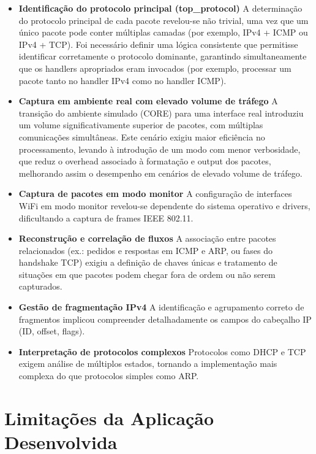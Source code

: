 \documentclass[a4paper,12pt]{article}
\begin{document}
\begin{itemize}

\item \textbf{Identificação do protocolo principal (top\_protocol)}  
A determinação do protocolo principal de cada pacote revelou-se não trivial, uma vez que um único pacote pode conter múltiplas camadas (por exemplo, IPv4 + ICMP ou IPv4 + TCP).  
Foi necessário definir uma lógica consistente que permitisse identificar corretamente o protocolo dominante, garantindo simultaneamente que os handlers apropriados eram invocados (por exemplo, processar um pacote tanto no handler IPv4 como no handler ICMP).

\item \textbf{Captura em ambiente real com elevado volume de tráfego}  
A transição do ambiente simulado (CORE) para uma interface real introduziu um volume significativamente superior de pacotes, com múltiplas comunicações simultâneas.  
Este cenário exigiu maior eficiência no processamento, levando à introdução de um modo com menor verbosidade, que reduz o overhead associado à formatação e output dos pacotes, melhorando assim o desempenho em cenários de elevado volume de tráfego.

\item \textbf{Captura de pacotes em modo monitor}  
A configuração de interfaces WiFi em modo monitor revelou-se dependente do sistema operativo e drivers, dificultando a captura de frames IEEE 802.11.

\item \textbf{Reconstrução e correlação de fluxos}  
A associação entre pacotes relacionados (ex.: pedidos e respostas em ICMP e ARP, ou fases do handshake TCP) exigiu a definição de chaves únicas e tratamento de situações em que pacotes podem chegar fora de ordem ou não serem capturados.

\item \textbf{Gestão de fragmentação IPv4}  
A identificação e agrupamento correto de fragmentos implicou compreender detalhadamente os campos do cabeçalho IP (ID, offset, flags).

\item \textbf{Interpretação de protocolos complexos}  
Protocolos como DHCP e TCP exigem análise de múltiplos estados, tornando a implementação mais complexa do que protocolos simples como ARP.

\end{itemize}

\section{Limitações da Aplicação Desenvolvida}
\end{document}
